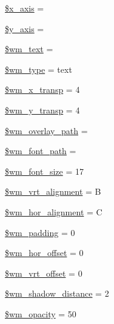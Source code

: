 \begin{DoxyCompactItemize}
\mbox{\hyperlink{class_c_i___image__lib_a128914b11765a500690f876962196ca6}{\$x\+\_\+axis}} = \textquotesingle{}\textquotesingle{}
\item 
\mbox{\hyperlink{class_c_i___image__lib_ac60512307da37068c0821f7dc2488608}{\$y\+\_\+axis}} = \textquotesingle{}\textquotesingle{}
\item 
\mbox{\hyperlink{class_c_i___image__lib_a412eac22e8d585a33f28f132f13d482b}{\$wm\+\_\+text}} = \textquotesingle{}\textquotesingle{}
\item 
\mbox{\hyperlink{class_c_i___image__lib_a530808b613890909a92bf6096401e9be}{\$wm\+\_\+type}} = \textquotesingle{}text\textquotesingle{}
\item 
\mbox{\hyperlink{class_c_i___image__lib_a720496900551e5c29b11a732fb4f35ab}{\$wm\+\_\+x\+\_\+transp}} = 4
\item 
\mbox{\hyperlink{class_c_i___image__lib_aa9ab81b196739723a7c38d9431c9fa11}{\$wm\+\_\+y\+\_\+transp}} = 4
\item 
\mbox{\hyperlink{class_c_i___image__lib_a82ec5b8a6822dc7f9c70f4b5aafdebd4}{\$wm\+\_\+overlay\+\_\+path}} = \textquotesingle{}\textquotesingle{}
\item 
\mbox{\hyperlink{class_c_i___image__lib_a6870985f3e6bbf1a29e5875c054598f4}{\$wm\+\_\+font\+\_\+path}} = \textquotesingle{}\textquotesingle{}
\item 
\mbox{\hyperlink{class_c_i___image__lib_a0ea2a2f73623aa0631670017a4e68419}{\$wm\+\_\+font\+\_\+size}} = 17
\item 
\mbox{\hyperlink{class_c_i___image__lib_a1c52f46917a30e084db07a8c8e13af86}{\$wm\+\_\+vrt\+\_\+alignment}} = \textquotesingle{}B\textquotesingle{}
\item 
\mbox{\hyperlink{class_c_i___image__lib_a74d790b77baa0c22cd0b812abc41765c}{\$wm\+\_\+hor\+\_\+alignment}} = \textquotesingle{}C\textquotesingle{}
\item 
\mbox{\hyperlink{class_c_i___image__lib_ab1f63f5ae604d060dbc39653f6440826}{\$wm\+\_\+padding}} = 0
\item 
\mbox{\hyperlink{class_c_i___image__lib_aed778e3e9ecb74e8c61d8c4894581f7f}{\$wm\+\_\+hor\+\_\+offset}} = 0
\item 
\mbox{\hyperlink{class_c_i___image__lib_a577602650e0c67f9f4bfcdeda075fa50}{\$wm\+\_\+vrt\+\_\+offset}} = 0
\item 
\mbox{\hyperlink{class_c_i___image__lib_a3d5174ca66ce7149799b5830873aa747}{\$wm\+\_\+shadow\+\_\+distance}} = 2
\item 
\mbox{\hyperlink{class_c_i___image__lib_a9cc2d95dbcbb26a2f3f0c7416fc5920b}{\$wm\+\_\+opacity}} = 50

\end{DoxyCompactItemize}
